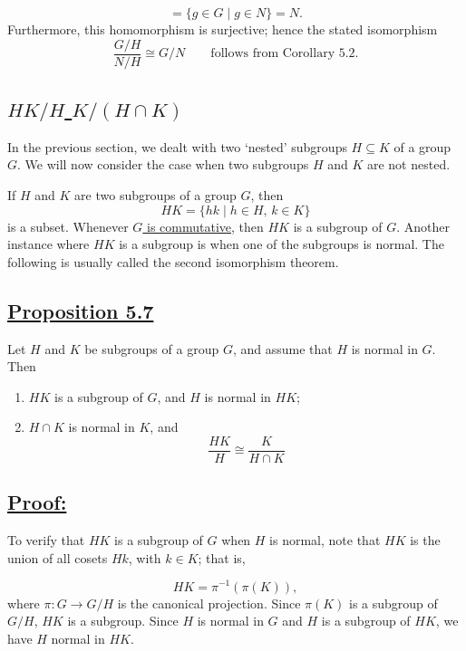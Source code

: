 \[
= \{g \in G \mid g \in N\} = N.
\]
Furthermore, this homomorphism is surjective; hence the stated isomorphism
\[
\frac{G/H}{N/H} \cong G/N \qquad \text{follows from Corollary 5.2.}
\]

\vspace{1em}

\subsection*{\underline{\large $HK/H$  $K/(H \cap K)$}}

In the previous section, we dealt with two `nested' subgroups $H \subseteq K$ of a group $G$. We will now consider the case when two subgroups $H$ and $K$ are not nested.

If $H$ and $K$ are two subgroups of a group $G$, then
\[
HK = \{hk \mid h \in H, \, k \in K\}
\]
is a subset. Whenever \underline{$G$ is commutative}, then $HK$ is a subgroup of $G$. Another instance where $HK$ is a subgroup is when one of the subgroups is normal. The following is usually called the second isomorphism theorem.

\vspace{1em}

\subsection*{\underline{Proposition 5.7}}
Let $H$ and $K$ be subgroups of a group $G$, and assume that $H$ is normal in $G$. Then
\begin{enumerate}
    \item $HK$ is a subgroup of $G$, and $H$ is normal in $HK$;
    \item $H \cap K$ is normal in $K$, and  \[
    \frac{HK}{H} \cong \frac{K}{H \cap K}
    \]
\end{enumerate}


\subsection*{\underline{Proof:}}
To verify that $HK$ is a subgroup of $G$ when $H$ is normal, note that $HK$ is the union of all cosets $Hk$, with $k \in K$; that is,


\[
HK = \pi^{-1}(\pi(K)),
\]
where $\pi : G \longrightarrow G/H$ is the canonical projection. Since $\pi(K)$ is a subgroup of $G/H$, $HK$ is a subgroup. Since $H$ is normal in $G$ and $H$ is a subgroup of $HK$, we have $H$ normal in $HK$.

